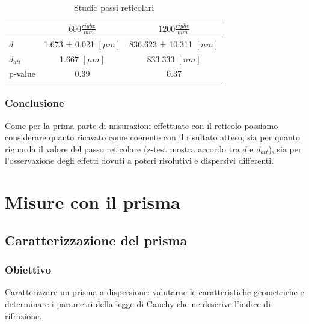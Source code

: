 \documentclass[a4paper]{article}
\begin{document}
\begin{table}[htbp]
\centering
\begin{tabular}{|l|c|c|}
\hline
 & $600 \frac{righe}{mm}$ & $1200 \frac{righe}{mm}$ \\\hline
$d$ & 1.673 ± 0.021 $[\mu m]$ & 836.623 ± 10.311 $[nm]$\\\hline
$d_{att} $ & 1.667 $[\mu m]$ & 833.333 $[nm]$\\\hline
p-value &  0.39 & 0.37 \\\hline
\end{tabular}
\caption{Studio passi reticolari}
\label{tab:passi+test_compatibilità}
\end{table}

\subsubsection{Conclusione}
Come per la prima parte di misurazioni effettuate con il reticolo possiamo considerare quanto ricavato come coerente con il risultato atteso; sia per quanto riguarda il valore del passo reticolare (z-test mostra accordo tra $d$ e $d_{att}$), sia per l'osservazione degli effetti dovuti a poteri risolutivi e dispersivi differenti.




\section{Misure con il prisma}
\subsection{Caratterizzazione del prisma}
\subsubsection{Obiettivo}
Caratterizzare un prisma a dispersione: valutarne le caratteristiche geometriche e determinare i parametri della legge di Cauchy che ne descrive l'indice di rifrazione.
\end{document}
